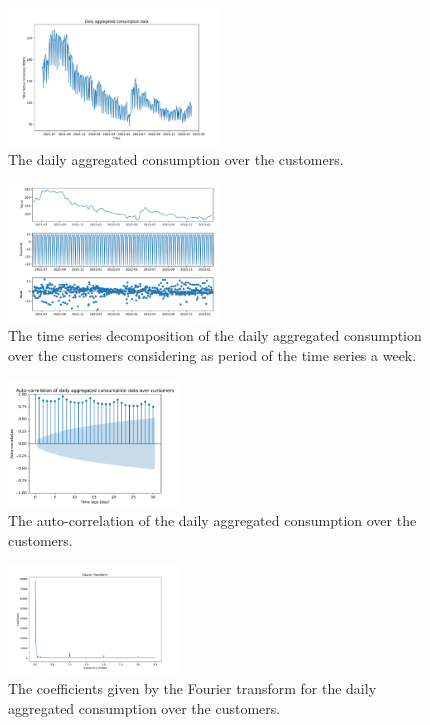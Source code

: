 \begin{figure}[H]
\centering
\includegraphics[width=0.5\textwidth]{images/demand/data_day_aggregated_plot}
\caption{The daily aggregated consumption over the customers.}
\label{fig:demanddataplotday}
\end{figure}

\begin{figure}[H]
\centering
\includegraphics[width=0.5\textwidth]{images/demand/daily_aggregated_decomposition}
\caption{The time series decomposition of the daily aggregated consumption over the customers considering as period of the time series a week.}
\label{fig:demanddecompositionday}
\end{figure}

\begin{figure}[H]
\centering
\includegraphics[width=0.4\textwidth]{images/demand/daily_aggregated_correlation}
\caption{The auto-correlation of the daily aggregated consumption over the customers.}
\label{fig:demandcorrelationday}
\end{figure}

\begin{figure}[H]
\centering
\includegraphics[width=0.4\textwidth]{images/demand/ft_day}
\caption{The coefficients given by the Fourier transform for the daily aggregated consumption over the customers.}
\label{fig:demandftday}
\end{figure}

